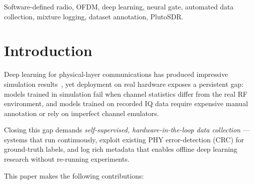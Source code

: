 \documentclass[conference]{IEEEtran}
\begin{document}
\begin{IEEEkeywords}
Software-defined radio, OFDM, deep learning, neural gate, automated
data collection, mixture logging, dataset annotation, PlutoSDR.
\end{IEEEkeywords}

\section{Introduction}
\label{sec:intro}

Deep learning for physical-layer communications has produced impressive
simulation results~\cite{o2017introduction,dorner2018deep}, yet deployment
on real hardware exposes a persistent gap: models trained in simulation
fail when channel statistics differ from the real RF environment, and
models trained on recorded IQ data require expensive manual annotation
or rely on imperfect channel emulators.

Closing this gap demands \emph{self-supervised, hardware-in-the-loop data
collection} — systems that run continuously, exploit existing PHY
error-detection (CRC) for ground-truth labels, and log rich metadata
that enables offline deep learning research without re-running experiments.

This paper makes the following contributions:
\end{document}
